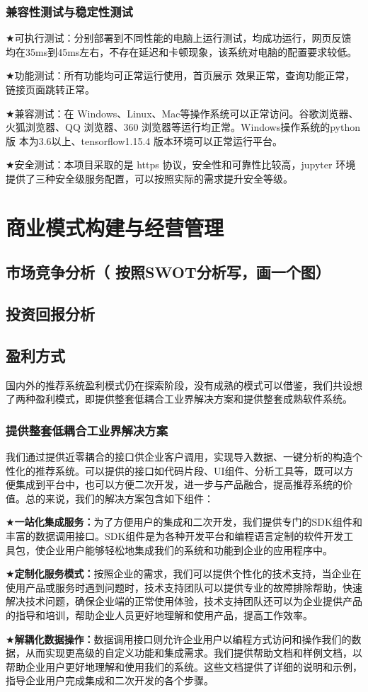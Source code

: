 \documentclass[withoutpreface,bwprint]{cumcmthesis} %
\begin{document}
	\subsubsection{ 兼容性测试与稳定性测试}
	$\bigstar$可执行测试：分别部署到不同性能的电脑上运行测试，均成功运行，网页反馈
	均在35ms到45ms左右，不存在延迟和卡顿现象，该系统对电脑的配置要求较低。\par
	$\bigstar$功能测试：所有功能均可正常运行使用，首页展示
	效果正常，查询功能正常，链接页面跳转正常。\par
	$\bigstar$兼容测试：在 Windows、Linux、Mac等操作系统可以正常访问。谷歌浏览器、
	火狐浏览器、QQ 浏览器、360 浏览器等运行均正常。Windows操作系统的python版
	本为3.6以上、tensorflow1.15.4 版本环境可以正常运行平台。\par
	$\bigstar$安全测试：本项目采取的是 https 协议，安全性和可靠性比较高，jupyter 环境
	提供了三种安全级服务配置，可以按照实际的需求提升安全等级。\par
	\newpage
	\section{商业模式构建与经营管理}
	\subsection{市场竞争分析（ 按照SWOT分析写，画一个图）}
	\subsection{投资回报分析}
	\subsection{盈利方式}
	国内外的推荐系统盈利模式仍在探索阶段，没有成熟的模式可以借鉴，我们共设想了两种盈利模式，即提供整套低耦合工业界解决方案和提供整套成熟软件系统。
	\subsubsection{ 提供整套低耦合工业界解决方案}
	我们通过提供近零耦合的接口供企业客户调用，实现导入数据、一键分析的构造个性化的推荐系统。可以提供的接口如代码片段、UI组件、分析工具等，既可以方便集成到平台中，也可以方便二次开发，进一步与产品融合，提高推荐系统的价值。总的来说，我们的解决方案包含如下组件：\par
	$\bigstar$\textbf{一站化集成服务：}为了方便用户的集成和二次开发，我们提供专门的SDK组件和丰富的数据调用接口。SDK组件是为各种开发平台和编程语言定制的软件开发工具包，使企业用户能够轻松地集成我们的系统和功能到企业的应用程序中。\par
	$\bigstar$\textbf{定制化服务模式：}按照企业的需求，我们可以提供个性化的技术支持，当企业在使用产品或服务时遇到问题时，技术支持团队可以提供专业的故障排除帮助，快速解决技术问题，确保企业端的正常使用体验，技术支持团队还可以为企业提供产品的指导和培训，帮助企业人员更好地理解和使用产品，提高工作效率。\par
	$\bigstar$\textbf{解耦化数据操作：}数据调用接口则允许企业用户以编程方式访问和操作我们的数据，从而实现更高级的自定义功能和集成需求。我们提供帮助文档和样例文档，以帮助企业用户更好地理解和使用我们的系统。这些文档提供了详细的说明和示例，指导企业用户完成集成和二次开发的各个步骤。\par
\end{document}
